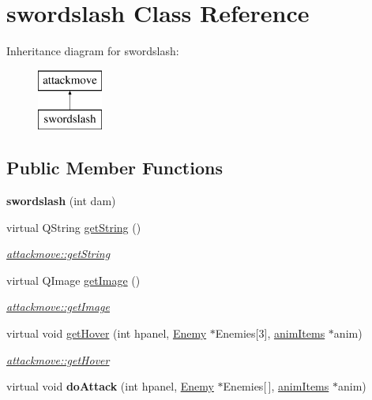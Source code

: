 \hypertarget{classswordslash}{\section{swordslash Class Reference}
\label{classswordslash}
}
Inheritance diagram for swordslash\-:\begin{figure}[H]
\begin{center}
\leavevmode
\includegraphics[height=2.000000cm]{classswordslash}
\end{center}
\end{figure}
\subsection*{Public Member Functions}
\begin{DoxyCompactItemize}
\item 
\hypertarget{classswordslash_a1c4547e783632e2e3e42642754dfb6ea}{{\bfseries swordslash} (int dam)}\label{classswordslash_a1c4547e783632e2e3e42642754dfb6ea}

\item 
virtual Q\-String \hyperlink{classswordslash_ac58a7e3b969bb957548c55bdfd6a0b05}{get\-String} ()
\begin{DoxyCompactList}\small\item\em \hyperlink{classattackmove_ada49eedf4b893372c576edd48fe73161}{attackmove\-::get\-String} \end{DoxyCompactList}\item 
virtual Q\-Image \hyperlink{classswordslash_a25cbfa2df6b5718a299eed09cf716822}{get\-Image} ()
\begin{DoxyCompactList}\small\item\em \hyperlink{classattackmove_aca59a2343b7a6c195d300dda5c8d952d}{attackmove\-::get\-Image} \end{DoxyCompactList}\item 
virtual void \hyperlink{classswordslash_af40c617c0463f788bda02fe5e8109511}{get\-Hover} (int hpanel, \hyperlink{class_enemy}{Enemy} $\ast$Enemies\mbox{[}3\mbox{]}, \hyperlink{classanim_items}{anim\-Items} $\ast$anim)
\begin{DoxyCompactList}\small\item\em \hyperlink{classattackmove_a0ff82349551bd72f4d57b3367bb318fa}{attackmove\-::get\-Hover} \end{DoxyCompactList}\item 
\hypertarget{classswordslash_a8583edccf2f8b5635797e6891f797211}{virtual void {\bfseries do\-Attack} (int hpanel, \hyperlink{class_enemy}{Enemy} $\ast$Enemies\mbox{[}$\,$\mbox{]}, \hyperlink{classanim_items}{anim\-Items} $\ast$anim)}\label{classswordslash_a8583edccf2f8b5635797e6891f797211}

\end{DoxyCompactItemize}
